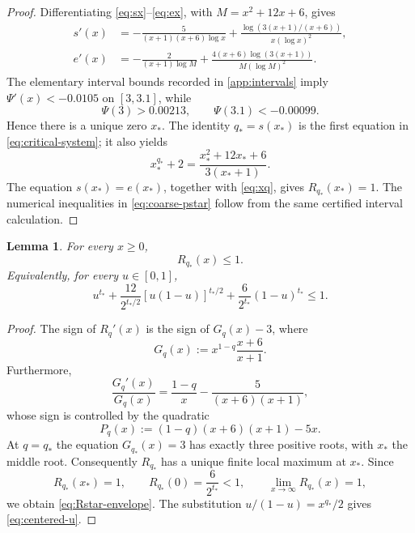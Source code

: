 \documentclass[11pt,reqno]{amsart}
\numberwithin{equation}{section}
\newtheorem{lemma}[lemma]{Lemma}
\theoremstyle{definition}
\theoremstyle{remark}
\begin{document}
\begin{proof}
Differentiating \eqref{eq:sx}--\eqref{eq:ex}, with
$M=x^2+12x+6$, gives
\begin{align*}
  s'(x)
  &=-\frac5{(x+1)(x+6)\log x}
    +\frac{\log(3(x+1)/(x+6))}{x(\log x)^2},\\
  e'(x)
  &=-\frac2{(x+1)\log M}
    +\frac{4(x+6)\log(3(x+1))}{M(\log M)^2}.
\end{align*}
The elementary interval bounds recorded in \cref{app:intervals} imply
$\Psi'(x)<-0.0105$ on $[3,3.1]$, while
\[
  \Psi(3)>0.00213,
  \qquad
  \Psi(3.1)<-0.00099.
\]
Hence there is a unique zero $x_*$.  The identity $q_*=s(x_*)$ is the
first equation in \eqref{eq:critical-system}; it also yields
\begin{equation}\label{eq:xq}
  x_*^{q_*}+2
  =\frac{x_*^2+12x_*+6}{3(x_*+1)}.
\end{equation}
The equation $s(x_*)=e(x_*)$, together with \eqref{eq:xq}, gives
$R_{q_*}(x_*)=1$.  The numerical inequalities in
\eqref{eq:coarse-pstar} follow from the same certified interval calculation.
\end{proof}

\begin{lemma}\label{lem:centered-envelope}
For every $x\ge0$,
\begin{equation}\label{eq:Rstar-envelope}
  R_{q_*}(x)\le1.
\end{equation}
Equivalently, for every $u\in[0,1]$,
\begin{equation}\label{eq:centered-u}
  u^{t_*}
  +\frac{12}{2^{t_*/2}}[u(1-u)]^{t_*/2}
  +\frac6{2^{t_*}}(1-u)^{t_*}\le1.
\end{equation}
\end{lemma}

\begin{proof}
The sign of $R_q'(x)$ is the sign of $G_q(x)-3$, where
\begin{equation}\label{eq:Gq}
  G_q(x):=x^{1-q}\frac{x+6}{x+1}.
\end{equation}
Furthermore,
\begin{equation}\label{eq:Gqprime}
  \frac{G_q'(x)}{G_q(x)}
  =\frac{1-q}{x}-\frac5{(x+6)(x+1)},
\end{equation}
whose sign is controlled by the quadratic
\[
  P_q(x):=(1-q)(x+6)(x+1)-5x.
\]
At $q=q_*$ the equation $G_{q_*}(x)=3$ has exactly three positive roots,
with $x_*$ the middle root.  Consequently $R_{q_*}$ has a unique finite
local maximum at $x_*$.  Since
\[
  R_{q_*}(x_*)=1,
  \qquad
  R_{q_*}(0)=\frac6{2^{t_*}}<1,
  \qquad
  \lim_{x\to\infty}R_{q_*}(x)=1,
\]
we obtain \eqref{eq:Rstar-envelope}.  The substitution
$u/(1-u)=x^{q_*}/2$ gives \eqref{eq:centered-u}.
\end{proof}
\end{document}
